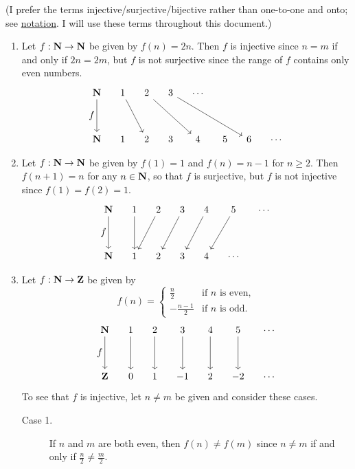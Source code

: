 \documentclass{lew98_solutions}
\begin{document}
\begin{solution}
    (I prefer the terms injective/surjective/bijective rather than one-to-one and onto; see \hyperlink{notation}{notation}. I will use these terms throughout this document.)
    \begin{enumerate}
        \item Let \( f : \mathbf{N} \to \mathbf{N} \) be given by \( f(n) = 2n \). Then \( f \) is injective since \( n = m \) if and only if \( 2n = 2m \), but \( f \) is not surjective since the range of \( f \) contains only even numbers.
        \[
            \begin{tikzcd}[row sep = 12mm, column sep = 4mm]
                \N \arrow[d, "f" {left, font=\normalsize}] & 1 \arrow[rd] & 2 \arrow[rrd] & 3 \arrow[rrrd] & \cdots \\
                \N & 1 & 2 & 3 & 4 & 5 & 6 & \cdots
            \end{tikzcd}
        \]

        \item Let \( f : \mathbf{N} \to \mathbf{N} \) be given by \( f(1) = 1 \) and \( f(n) = n - 1 \) for \( n \geq 2 \). Then \( f(n + 1) = n \) for any \( n \in \mathbf{N} \), so that \( f \) is surjective, but \( f \) is not injective since \( f(1) = f(2) = 1 \).
        \[
            \begin{tikzcd}[row sep = 12mm, column sep = 4mm]
                \N \arrow[d, "f" {left, font=\normalsize}] & 1 \arrow[d] & 2 \arrow[ld] & 3 \arrow[ld] & 4 \arrow[ld] & 5 \arrow[ld] & \cdots \\
                \N & 1 & 2 & 3 & 4 & \cdots
            \end{tikzcd}
        \]

        \item Let \( f : \mathbf{N} \to \mathbf{Z} \) be given by
        \[
            f(n) = \begin{cases}
                \tfrac{n}{2} & \text{if } n \text{ is even}, \\
                -\tfrac{n-1}{2} & \text{if } n \text{ is odd}.
            \end{cases}
        \]
        \[
            \begin{tikzcd}[row sep = 12mm, column sep = 4mm]
                \N \arrow[d, "f" {left, font=\normalsize}] & 1 \arrow[d] & 2 \arrow[d] & 3 \arrow[d] & 4 \arrow[d] & 5 \arrow[d] & \cdots \\
                \Z & 0 & 1 & -1 & 2 & -2 & \cdots
            \end{tikzcd}
        \]
        To see that \( f \) is injective, let \( n \neq m \) be given and consider these cases.
        \begin{description}
            \item[Case 1.] If \( n \) and \( m \) are both even, then \( f(n) \neq f(m) \) since \( n \neq m \) if and only if \( \tfrac{n}{2} \neq \tfrac{m}{2} \).


\end{description}
\end{enumerate}
\end{solution}
\end{document}

